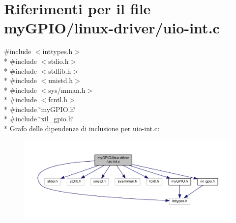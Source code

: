 \hypertarget{uio-int_8c}{\section{Riferimenti per il file my\+G\+P\+I\+O/linux-\/driver/uio-\/int.c}
\label{uio-int_8c}
}
{\ttfamily \#include $<$inttypes.\+h$>$}\\*
{\ttfamily \#include $<$stdio.\+h$>$}\\*
{\ttfamily \#include $<$stdlib.\+h$>$}\\*
{\ttfamily \#include $<$unistd.\+h$>$}\\*
{\ttfamily \#include $<$sys/mman.\+h$>$}\\*
{\ttfamily \#include $<$fcntl.\+h$>$}\\*
{\ttfamily \#include \char`\"{}my\+G\+P\+I\+O.\+h\char`\"{}}\\*
{\ttfamily \#include \char`\"{}xil\+\_\+gpio.\+h\char`\"{}}\\*
Grafo delle dipendenze di inclusione per uio-\/int.c\+:\nopagebreak
\begin{figure}[H]
\begin{center}
\leavevmode
\includegraphics[width=350pt]{uio-int_8c__incl}
\end{center}
\end{figure}
